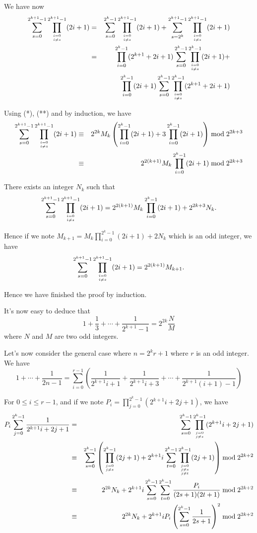 \documentclass[a4paper,12pt]{article}
\begin{document}
We have now
\begin{eqnarray*}
  \sum_{s=0}^{2^{k+1}-1} \prod_{i=0\atop i\not= s}^{2^{k+1}-1}(2i+1)
  &=& \sum_{s=0}^{2^k-1} \prod_{i=0\atop i\not= s}^{2^{k+1}-1}(2i+1) +
  \sum_{s = 2^k}^{2^{k+1}-1} \prod_{i=0\atop i\not=
    s}^{2^{k+1}-1}(2i+1) \\
  &=& \prod_{i=0}^{2^k-1}(2^{k+1}+2i+1) \sum_{s=0}^{2^k-1}
  \prod_{i=0\atop i\not=s}^{2^k-1}(2i+1) + \\
  && \prod_{i=0}^{2^k-1}(2i+1) \sum_{s=0}^{2^k-1} \prod_{i=0\atop
    i\not=s}^{2^k -1}(2^{k+1} + 2i + 1)
\end{eqnarray*}

Using (*), (**) and by induction, we have
\begin{eqnarray*}
  \sum_{s=0}^{2^{k+1}-1} \prod_{i=0\atop i\not= s}^{2^{k+1}-1}(2i+1)
  &\equiv& 2^{2k}M_k\left(\prod_{i=0}^{2^k-1}(2i+1) +
  3\prod_{i=0}^{2^k-1}(2i+1)\right)\bmod 2^{2k+3} \\
  &\equiv& 2^{2(k+1)}M_k \prod_{i=0}^{2^k-1}(2i+1)\bmod 2^{2k+3}
\end{eqnarray*}

There exists an integer $N_k$ such that
\[ \sum_{s=0}^{2^{k+1}-1} \prod_{i=0\atop i\not=
  s}^{2^{k+1}-1}(2i+1) = 2^{2(k+1)} M_k \prod_{i=0}^{2^k-1}(2i+1) +
2^{2k+3}N_k.\]

Hence if we note $M_{k+1} = M_k \prod_{i=0}^{2^k-1}(2i+1) + 2N_k$
which is an odd integer, we have
\[ \sum_{s=0}^{2^{k+1}-1} \prod_{i=0\atop i\not=
  s}^{2^{k+1}-1}(2i+1) = 2^{2(k+1)} M_{k+1}.\]

Hence we have finished the proof by induction.

It's now easy to deduce that $$ 1 + \frac{1}{3} + \cdots +
\frac{1}{2^{k+1}-1} = 2^{2k} \frac{N}{M}$$ where $N$ and $M$ are two
odd integers.

Let's now consider the general case where $n = 2^kr+1$ where $r$ is an
odd integer.  We have
\[1 + \cdots + \frac{1}{2n-1} =
\sum_{i=0}^{r-1}\left(\frac{1}{2^{k+1}i+1} + \frac{1}{2^{k+1}i+3} +
\cdots + \frac{1}{2^{k+1}(i+1)-1}\right)\]

For $0\le i\le r-1$, and if we note $P_i =
\prod_{j=0}^{2^k-1}(2^{k+1}i + 2j + 1)$,  we have
\begin{eqnarray*}
P_i\sum_{j=0}^{2^k-1} \frac{1}{2^{k+1}i + 2j + 1} &=&
\sum_{s=0}^{2^k-1} \prod_{j=0\atop j\not=s}^{2^k-1} (2^{k+1}i +
  2j + 1) \\
&\equiv& \sum_{s=0}^{2^k-1}\left(\prod_{j=0\atop
    j\not=s}^{2^k-1}(2j+1)+2^{k+1}i\sum_{t=0}^{2^k-1}\prod_{j=0\atop{j\not=s \atop
      j\not=t}}^{2^k-1}(2j+1)\right)  \bmod 2^{2k+2} \\
  &\equiv& 2^{2k}N_k + 2^{k+1}i
  \sum_{s=0}^{2^k-1}\sum_{t=0}^{2^k-1}\frac{P_i}{(2s+1)(2t+1)} \bmod
  2^{2k+2} \\
  &\equiv& 2^{2k}N_k + 2^{k+1}{i}P_i \left(\sum_{s=0}^{2^k-1}
  \frac{1}{2s+1}\right)^2 \bmod 2^{2k+2}
\end{eqnarray*}
\end{document}
